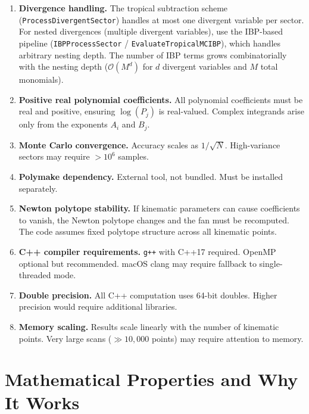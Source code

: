 \documentclass[11pt,a4paper]{article}
\begin{document}
\begin{enumerate}
  \item \textbf{Divergence handling.} The tropical subtraction scheme (\texttt{ProcessDivergentSector}) handles at most one divergent variable per sector.  For nested divergences (multiple divergent variables), use the IBP-based pipeline (\texttt{IBPProcessSector} / \texttt{EvaluateTropicalMCIBP}), which handles arbitrary nesting depth.  The number of IBP terms grows combinatorially with the nesting depth ($\mathcal{O}(M^d)$ for $d$ divergent variables and $M$ total monomials).

  \item \textbf{Positive real polynomial coefficients.} All polynomial coefficients must be real and positive, ensuring $\log(P_j)$ is real-valued. Complex integrands arise only from the exponents $A_i$ and $B_j$.

  \item \textbf{Monte Carlo convergence.} Accuracy scales as $1/\sqrt{N}$. High-variance sectors may require $> 10^6$ samples.

  \item \textbf{Polymake dependency.} External tool, not bundled. Must be installed separately.

  \item \textbf{Newton polytope stability.} If kinematic parameters can cause coefficients to vanish, the Newton polytope changes and the fan must be recomputed. The code assumes fixed polytope structure across all kinematic points.

  \item \textbf{C++ compiler requirements.} \texttt{g++} with C++17 required. OpenMP optional but recommended. macOS clang may require fallback to single-threaded mode.

  \item \textbf{Double precision.} All C++ computation uses 64-bit doubles. Higher precision would require additional libraries.

  \item \textbf{Memory scaling.} Results scale linearly with the number of kinematic points. Very large scans ($\gg 10{,}000$ points) may require attention to memory.
\end{enumerate}

\section{Mathematical Properties and Why It Works}
\end{document}
